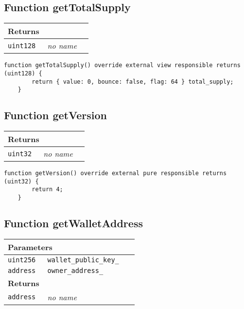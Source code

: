 \subsection{Function getTotalSupply}


\ifsoltables
\noindent\begin{tabular}{|l|l|p{5cm}|}\hline
\multicolumn{3}{|l|}{\bf Returns}\\\hline
\tt uint128 & {\em no name} &\\\hline
\end{tabular}
\fi

\vspace{2cm}

\begin{lstlisting}[firstnumber=92]
    function getTotalSupply() override external view responsible returns (uint128) {
        return { value: 0, bounce: false, flag: 64 } total_supply;
    }
\end{lstlisting}

\subsection{Function getVersion}


\ifsoltables
\noindent\begin{tabular}{|l|l|p{5cm}|}\hline
\multicolumn{3}{|l|}{\bf Returns}\\\hline
\tt uint32 & {\em no name} &\\\hline
\end{tabular}
\fi

\vspace{2cm}

\begin{lstlisting}[firstnumber=63]
    function getVersion() override external pure responsible returns (uint32) {
        return 4;
    }
\end{lstlisting}

\subsection{Function getWalletAddress}


\ifsoltables
\noindent\begin{tabular}{|l|l|p{5cm}|}\hline
\multicolumn{3}{|l|}{\bf Parameters}\\\hline
\tt uint256 & \tt wallet\_{}public\_{}key\_{} &\\\hline
\tt address & \tt owner\_{}address\_{} &\\\hline
\multicolumn{3}{|l|}{\bf Returns}\\\hline
\tt address & {\em no name} &\\\hline
\end{tabular}
\fi


